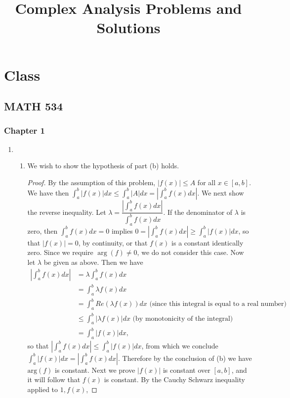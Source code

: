 \documentclass[11pt]{book}
\theoremstyle{definition}
\begin{document}
\title{Complex Analysis Problems and Solutions}
\maketitle
\tableofcontents
\chapter{Class}
\section{MATH 534}
\subsection{Chapter 1}
\begin{enumerate}
\item
\begin{enumerate}
\item We wish to show the hypothesis of part (b) holds.
\begin{proof}
By the assumption of this problem, $|f(x)|\leq A$ for all $x\in[a,b]$. We have then
$\int_a^b |f(x)|dx\leq \int_a^b |A|dx = \left|\int_a^b f(x)dx\right|$. We next show the reverse inequality. Let $\lambda = \dfrac{|\int_a^bf(x)dx|}{\int_a^bf(x)dx}$. If the denominator of $\lambda$ is zero, then $\int_a^b f(x)dx=0$ implies $0=\left|\int_a^b f(x)dx\right|\geq\int_a^b |f(x)|dx$, so that $|f(x)|=0$, by continuity, or that $f(x)$ is a constant identically zero. Since we require $\arg(f)\neq 0$, we do not consider this case. Now let $\lambda$ be given as above. Then we have
\begin{align*}
\left|\int_a^b f(x)dx\right| &= \lambda\int_a^b f(x)dx \\
&= \int_a^b \lambda f(x)dx \\
&= \int_a^b Re(\lambda f(x))dx \text{ (since this integral is equal to a real number)} \\
&\leq \int_a^b |\lambda f(x)|dx \text{ (by monotonicity of the integral)} \\
&= \int_a^b |f(x)|dx,
\end{align*}
so that $\left|\int_a^b f(x)dx\right|\leq \int_a^b |f(x)|dx$, from which we conclude $\int_a^b|f(x)|dx=\left|\int_a^bf(x)dx\right|$. Therefore by the conclusion of (b) we have $\mathrm{arg}(f)$ is constant. Next we prove $|f(x)|$ is constant over $[a,b]$, and it will follow that $f(x)$ is constant. By the Cauchy Schwarz inequality applied to $1, f(x)$,

\end{proof}
\end{enumerate}
\end{enumerate}
\end{document}
